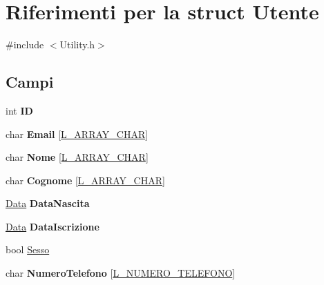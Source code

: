 \hypertarget{struct_utente}{}\section{Riferimenti per la struct Utente}
\label{struct_utente}


{\ttfamily \#include $<$Utility.\+h$>$}

\subsection*{Campi}
\begin{DoxyCompactItemize}
\item 
\mbox{\label{struct_utente_ad451d2360536730d64f4f28fe56132d7}} 
int {\bfseries ID}
\item 
\mbox{\label{struct_utente_a37368feb5b364e61d3953b60f11d7a52}} 
char {\bfseries Email} \mbox{[}\hyperlink{_utility_8h_ae6fe535e42e6e8133ccf04fada313020}{L\+\_\+\+A\+R\+R\+A\+Y\+\_\+\+C\+H\+AR}\mbox{]}
\item 
\mbox{\label{struct_utente_ab7db42dfb62d9bfc2f4e51a35625733c}} 
char {\bfseries Nome} \mbox{[}\hyperlink{_utility_8h_ae6fe535e42e6e8133ccf04fada313020}{L\+\_\+\+A\+R\+R\+A\+Y\+\_\+\+C\+H\+AR}\mbox{]}
\item 
\mbox{\label{struct_utente_a331a74e763ab640b31fdf536e9e3b077}} 
char {\bfseries Cognome} \mbox{[}\hyperlink{_utility_8h_ae6fe535e42e6e8133ccf04fada313020}{L\+\_\+\+A\+R\+R\+A\+Y\+\_\+\+C\+H\+AR}\mbox{]}
\item 
\mbox{\label{struct_utente_ae0e00c89cbf6ac9af15c23c5ca2ce8b1}} 
\hyperlink{struct_data}{Data} {\bfseries Data\+Nascita}
\item 
\mbox{\label{struct_utente_afd2247aab27d2e8c57d808d5fca83583}} 
\hyperlink{struct_data}{Data} {\bfseries Data\+Iscrizione}
\item 
bool \hyperlink{struct_utente_ad973b65f5d1a9365e9dd93503c12159c}{Sesso}
\item 
\mbox{\label{struct_utente_a32cd79cdf1115deb8c788a849de2366a}} 
char {\bfseries Numero\+Telefono} \mbox{[}\hyperlink{_utility_8h_ae8676214c7dc4bc187dd3f103b5b5704}{L\+\_\+\+N\+U\+M\+E\+R\+O\+\_\+\+T\+E\+L\+E\+F\+O\+NO}\mbox{]}
\end{DoxyCompactItemize}



